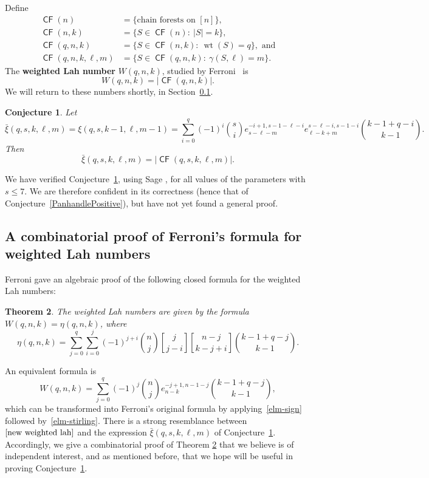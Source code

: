 \documentclass[11pt]{amsart}
\newtheorem{theorem}{Theorem}[section]
\newtheorem{conjecture}[theorem]{Conjecture}
\theoremstyle{definition}
\newcommand{\0}{\emptyset}
\newcommand{\defterm}[1]{\textbf{#1}}
\DeclareMathOperator{\CF}{\mathsf{CF}}
\DeclareMathOperator{\wt}{wt}
\newcommand{\elm}[2]{e_{#1}^{#2}} %
\DeclareRobustCommand{\stir}{\genfrac[]{0pt}{}} %
\begin{document}
Define
\begin{align*}
\CF(n) &= \{\text{chain forests on $[n]$}\},\\
\CF(n,k) &= \{S\in\CF(n):\ |S|=k\},\\
\CF(q,n,k) &= \{S\in\CF(n,k):\ \wt(S)=q\},\text{ and}\\
\CF(q,n,k,\ell,m)&=\{S\in \CF(q,n,k):\ \gamma(S,\ell)=m\}.
\end{align*}
The \defterm{weighted Lah number} $W(q,n,k)$, studied by Ferroni~\cite{FerroniHypersimplices} is
\[W(q,n,k)=|\CF(q,n,k)|.\]
We will return to these numbers shortly, in Section~\ref{sec:weighted Lah}.

\begin{conjecture}\label{big conjecture}
Let
\[\bar\xi(q,s,k,\ell,m)=\xi(q,s,k-1,\ell,m-1)
= \sum_{i=0}^q(-1)^i\binom{s}{i} \elm{s-\ell-m}{-i+1,s-1-\ell-i} \elm{\ell-k+m}{s-\ell-i,s-1-i} \binom{k-1+q-i}{k-1}.\]
Then
\[
\bar\xi(q,s,k,\ell,m)=|\CF(q,s,k,\ell,m)|.
\]
\end{conjecture}

We have verified Conjecture~\ref{big conjecture}, using Sage \cite{Sage}, for all values of the parameters with $s\leq 7$.
We are therefore confident in its correctness (hence that of Conjecture~\ref{PanhandlePositive}), but have not yet found a general proof.


\subsection{A combinatorial proof of Ferroni's formula for weighted Lah numbers} \label{sec:weighted Lah}
Ferroni gave an algebraic proof of the following closed formula for the weighted Lah numbers:

\begin{theorem} \cite[Cor.~3.13]{FerroniHypersimplices} \label{weighted lah}
The weighted Lah numbers are given by the formula $W(q,n,k)=\eta(q,n,k)$, where
\begin{equation} \label{eqn:weighted lah}
\eta(q,n,k)=\sum_{j=0}^q\sum_{i=0}^{j} (-1)^{j+i} \binom{n}{j} \stir{j}{j-i}\stir{n-j}{k-j+i}\binom{k-1+q-j}{k-1}.
\end{equation}
\end{theorem}

An equivalent formula is
\begin{equation} \label{new weighted lah}
W(q,n,k)=\sum_{j=0}^q(-1)^j\binom{n}{j} \elm{n-k}{-j+1,n-1-j} \binom{k-1+q-j}{k-1},
\end{equation}
which can be transformed into Ferroni's original formula by applying~\eqref{elm-sign} followed by~\eqref{elm-stirling}.
There is a strong resemblance between $\eqref{new weighted lah}$ and the expression $\bar\xi(q,s,k,\ell,m)$ of Conjecture~\ref{big conjecture}.
Accordingly, we give a combinatorial proof of Theorem \ref{weighted lah} that we believe is of independent interest, and as mentioned before, that we hope will be useful in proving Conjecture~\ref{big conjecture}.
\end{document}
